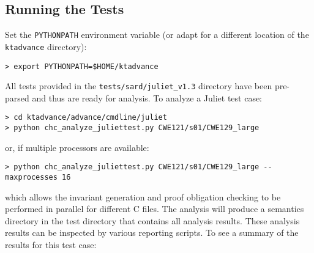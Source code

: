 \documentclass[11pt]{article}
\begin{document}
\subsection{Running the Tests}

Set the {\tt PYTHONPATH} environment variable (or adapt for a different location of the {\tt ktadvance}
directory):
\begin{verbatim}
> export PYTHONPATH=$HOME/ktadvance
\end{verbatim}
All tests provided in the {\tt tests/sard/juliet\_v1.3} directory have been pre-parsed and
thus are ready for analysis. To analyze a Juliet test case:
\begin{verbatim}
> cd ktadvance/advance/cmdline/juliet
> python chc_analyze_juliettest.py CWE121/s01/CWE129_large
\end{verbatim}
or, if multiple processors are available:
\begin{verbatim}
> python chc_analyze_juliettest.py CWE121/s01/CWE129_large --maxprocesses 16
\end{verbatim}
which allows the invariant generation and proof obligation checking to be
performed in parallel for different C files.
The analysis will produce a semantics directory in the test directory that contains all analysis
results. These analysis results can be inspected by various reporting scripts.
To see a summary of the results for this test case:
\end{document}
